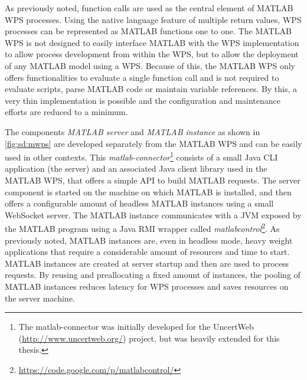   As previously noted, function calls are used as the central element of MATLAB WPS processes. Using the native language feature of multiple return values, WPS processes can be represented as MATLAB functions one to one. The MATLAB WPS is not designed to easily interface MATLAB with the WPS implementation to allow process development from within the WPS, but to allow the deployment of any MATLAB model using a WPS. Because of this, the MATLAB WPS only offers functionalities to evaluate a single function call and is not required to evaluate scripts, parse MATLAB code or maintain variable references. By this, a very thin implementation is possible and the configuration and maintenance efforts are reduced to a minimum.

  The components \emph{MATLAB server} and \emph{MATLAB instance} as shown in \cref{fig:sd:mwps} are developed separately from the MATLAB WPS and can be easily used in other contexts. This \emph{matlab-connector}\footnote{The matlab-connector was initially developed for the UncertWeb (\url{http://www.uncertweb.org/}) project, but was heavily extended for this thesis.} consists of a small Java CLI application (the server) and an associated Java client library used in the MATLAB WPS, that offers a simple \ac{API} to build MATLAB requests. The server component is started on the machine on which MATLAB is installed, and then offers a configurable amount of headless MATLAB instances using a small WebSocket server. The MATLAB instance communicates with a \ac{JVM} exposed by the MATLAB program using a Java \ac{RMI} wrapper called \emph{matlabcontrol}\footnote{\url{https://code.google.com/p/matlabcontrol/}}. As previously noted, MATLAB instances are, even in headless mode, heavy weight applications that require a considerable amount of resources and time to start. MATLAB instances are created at server startup and then are used to process requests. By reusing and preallocating a fixed amount of instances, the pooling of MATLAB instances reduces latency for WPS processes and saves resources on the server machine.

